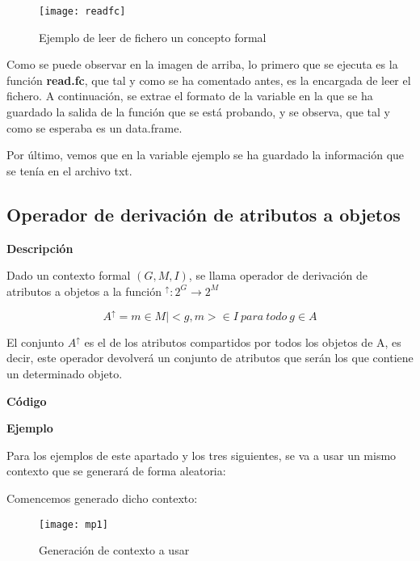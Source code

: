         \begin{figure}[H]
            \centering
            \texttt{[image: readfc]}
            \caption{Ejemplo de leer de fichero un concepto formal}
            \label{fig:readfc}
        \end{figure}

        Como se puede observar en la imagen de arriba, lo primero que se ejecuta es la funci\'on \textbf{read.fc}, que tal y como se ha comentado 
        antes, es la encargada de leer el fichero. A continuaci\'on, se extrae el formato de la variable en la que se ha guardado la 
        salida de la funci\'on que se est\'a probando, y se observa, que tal y como se esperaba es un data.frame.

        Por \'ultimo, vemos que en la variable ejemplo se ha guardado la informaci\'on que se ten\'ia en el archivo txt.

    \subsection{Operador de derivaci\'on de atributos a objetos}

        \textbf{Descripci\'on}

        Dado un contexto formal \( (G, M, I) \), se llama operador de derivaci\'on de atributos a objetos a la 
        funci\'on \( ^\uparrow : 2^G \rightarrow 2^M \)

        \[ A^\uparrow = { m \in M | <g,m> \in I ~ para ~ todo ~ g \in A } \]

        El conjunto \( A^\uparrow \) es el de los atributos compartidos por todos los objetos de A, es decir, este operador devolver\'a 
        un conjunto de atributos que ser\'an los que contiene un determinado objeto.
        \\
        
        \clearpage

        \textbf{C\'odigo}

        


        \textbf{Ejemplo}

        Para los ejemplos de este apartado y los tres siguientes, se va a usar un mismo contexto que se generar\'a de forma aleatoria:

        Comencemos generado dicho contexto:

        \begin{figure}[H]
            \centering
            \texttt{[image: mp1]}
            \caption{Generaci\'on de contexto a usar}
            \label{fig:mp1}
        \end{figure}


